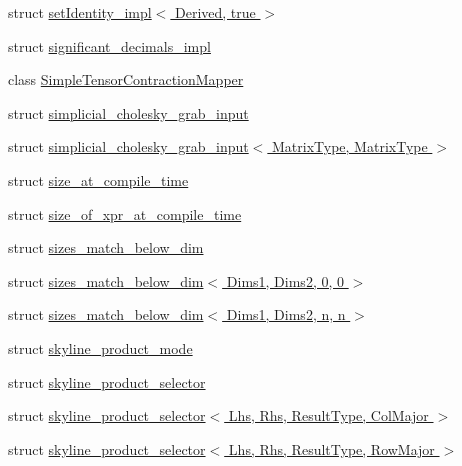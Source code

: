 \begin{DoxyCompactItemize}
\item 
struct \hyperlink{struct_eigen_1_1internal_1_1set_identity__impl_3_01_derived_00_01true_01_4}{set\+Identity\+\_\+impl$<$ Derived, true $>$}
\item 
struct \hyperlink{struct_eigen_1_1internal_1_1significant__decimals__impl}{significant\+\_\+decimals\+\_\+impl}
\item 
class \hyperlink{class_eigen_1_1internal_1_1_simple_tensor_contraction_mapper}{Simple\+Tensor\+Contraction\+Mapper}
\item 
struct \hyperlink{struct_eigen_1_1internal_1_1simplicial__cholesky__grab__input}{simplicial\+\_\+cholesky\+\_\+grab\+\_\+input}
\item 
struct \hyperlink{struct_eigen_1_1internal_1_1simplicial__cholesky__grab__input_3_01_matrix_type_00_01_matrix_type_01_4}{simplicial\+\_\+cholesky\+\_\+grab\+\_\+input$<$ Matrix\+Type, Matrix\+Type $>$}
\item 
struct \hyperlink{struct_eigen_1_1internal_1_1size__at__compile__time}{size\+\_\+at\+\_\+compile\+\_\+time}
\item 
struct \hyperlink{struct_eigen_1_1internal_1_1size__of__xpr__at__compile__time}{size\+\_\+of\+\_\+xpr\+\_\+at\+\_\+compile\+\_\+time}
\item 
struct \hyperlink{struct_eigen_1_1internal_1_1sizes__match__below__dim}{sizes\+\_\+match\+\_\+below\+\_\+dim}
\item 
struct \hyperlink{struct_eigen_1_1internal_1_1sizes__match__below__dim_3_01_dims1_00_01_dims2_00_010_00_010_01_4}{sizes\+\_\+match\+\_\+below\+\_\+dim$<$ Dims1, Dims2, 0, 0 $>$}
\item 
struct \hyperlink{struct_eigen_1_1internal_1_1sizes__match__below__dim_3_01_dims1_00_01_dims2_00_01n_00_01n_01_4}{sizes\+\_\+match\+\_\+below\+\_\+dim$<$ Dims1, Dims2, n, n $>$}
\item 
struct \hyperlink{struct_eigen_1_1internal_1_1skyline__product__mode}{skyline\+\_\+product\+\_\+mode}
\item 
struct \hyperlink{struct_eigen_1_1internal_1_1skyline__product__selector}{skyline\+\_\+product\+\_\+selector}
\item 
struct \hyperlink{struct_eigen_1_1internal_1_1skyline__product__selector_3_01_lhs_00_01_rhs_00_01_result_type_00_01_col_major_01_4}{skyline\+\_\+product\+\_\+selector$<$ Lhs, Rhs, Result\+Type, Col\+Major $>$}
\item 
struct \hyperlink{struct_eigen_1_1internal_1_1skyline__product__selector_3_01_lhs_00_01_rhs_00_01_result_type_00_01_row_major_01_4}{skyline\+\_\+product\+\_\+selector$<$ Lhs, Rhs, Result\+Type, Row\+Major $>$}

\end{DoxyCompactItemize}
